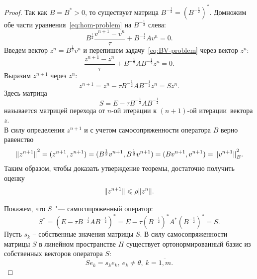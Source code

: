 \documentclass[11pt,a4paper,twoside]{report}
\numberwithin{equation}{section}
\theoremstyle{definition}
\theoremstyle{plain}
\DeclarePairedDelimiter\norm{\lVert}{\rVert}
\begin{document}
\begin{proof}
    Так как $B = B^\ast > 0$, то существует матрица $B^{-\frac{1}{2}} =
    \left(B^{-\frac{1}{2}}\right)^*$. Домножим обе части
    уравнения~\eqref{eq:hom-problem} на $B^{-\frac{1}{2}}$ слева:
    \begin{equation}
        \label{eq:BV-problem}
        B^{\frac{1}{2}}\frac{v^{n+1} - v^n}{\tau} + B^{-\frac{1}{2}}Av^n = 0.
    \end{equation}
    Введем вектор $z^n = B^{\frac{1}{2}}v^n$ и перепишем
    задачу~\eqref{eq:BV-problem} через вектор $z^n$:
    $$
        \frac{z^{n+1} - z^n}{\tau} + B^{-\frac{1}{2}}AB^{-\frac{1}{2}}z^n = 0.
    $$
    Выразим $z^{n+1}$ через $z^n$:
    $$
        z^{n+1} = z^n - \tau B^{-\frac{1}{2}}AB^{-\frac{1}{2}}z^n = Sz^n.
    $$
    Здесь матрица
    \begin{equation}
        \label{eq:S-eq}
        S = E - \tau B^{-\frac{1}{2}}AB^{-\frac{1}{2}}
    \end{equation}
    называется матрицей перехода от $n$-ой итерации к $(n+1)$-ой итерации\
    вектора $z$.
    \\
    В силу определения $z^{n+1}$ и с учетом самосопряженности оператора $B$
    верно равенство
    $$
        {\norm{z^{n+1}}}^2 = (z^{n+1}, z^{n+1}) =
        (B^{\frac{1}{2}}v^{n+1}, B^{\frac{1}{2}}v^{n+1}) = (Bv^{n+1}, v^{n+1}) =
        {\norm{v^{n+1}}}_B^2.
    $$
    Таким образом, чтобы доказать утверждение теоремы, достаточно получить
    оценку
    $$
        {\norm{z^{n+1}}} \leqslant \rho {\norm{z^n}}.
    $$

    Покажем, что $S$~"--- самосопряженный оператор:
    $$
        S^* = \left(E - \tau B^{-\frac{1}{2}}AB^{-\frac{1}{2}}\right)^* =
        E - \tau \left(B^{-\frac{1}{2}}\right)^* A^*
        \left(B^{-\frac{1}{2}}\right)^* = S.
    $$
    Пусть $s_k$ -- собственные значения матрицы $S$.
    В силу самосопряженности матрицы $S$ в линейном пространстве $H$
    существует ортонормированный базис из собственных векторов оператора $S$:
    \begin{equation}
        \label{eq:S-basis}
        Se_k = s_ke_k, ~e_k \neq \theta, ~k = \overline{1,m}.
    \end{equation}


\end{proof}
\end{document}
